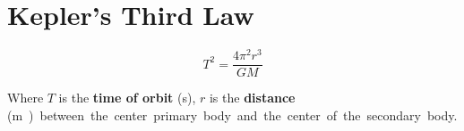 \documentclass[11pt]{article}
\newcommand\textcenter[1]{
	\begin{center}
		#1
	\end{center}
}
\begin{document}
\section{Kepler's Third Law}

\begin{equation}
	T^2 = \frac{4\pi^2r^3}{GM}
\end{equation}

\textcenter{Where $T$ is the \textbf{time of orbit} (\si{\second}), $r$ is the \textbf{distance} (\si\meter) between the center primary body and the center of the secondary body.}
\end{document}

